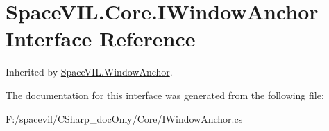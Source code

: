 \hypertarget{interface_space_v_i_l_1_1_core_1_1_i_window_anchor}{}\section{Space\+V\+I\+L.\+Core.\+I\+Window\+Anchor Interface Reference}
\label{interface_space_v_i_l_1_1_core_1_1_i_window_anchor}


Inherited by \mbox{\hyperlink{class_space_v_i_l_1_1_window_anchor}{Space\+V\+I\+L.\+Window\+Anchor}}.



The documentation for this interface was generated from the following file\+:\begin{DoxyCompactItemize}
\item 
F\+:/spacevil/\+C\+Sharp\+\_\+doc\+Only/\+Core/I\+Window\+Anchor.\+cs\end{DoxyCompactItemize}
